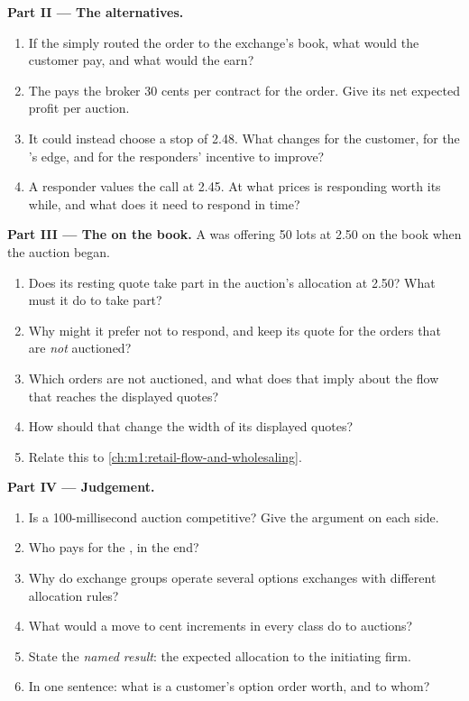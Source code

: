 \begin{problem}
\medskip\noindent\textbf{Part II --- The alternatives.}
\begin{enumerate}[resume]
\item If the  simply routed the order to the exchange's book, what
would the customer pay, and what would the  earn?
\item The  pays the broker 30 cents per contract for the order.
Give its net expected profit per auction.
\item It could instead choose a stop of 2.48. What changes for the customer,
for the 's edge, and for the responders' incentive to improve?
\item A responder values the call at 2.45. At what prices is responding
worth its while, and what does it need to respond in time?
\end{enumerate}

\medskip\noindent\textbf{Part III --- The  on the book.}
A  was offering 50 lots at 2.50 on the book when the auction
began.
\begin{enumerate}[resume]
\item Does its resting quote take part in the auction's allocation at 2.50?
What must it do to take part?
\item Why might it prefer not to respond, and keep its quote for the orders
that are \emph{not} auctioned?
\item Which orders are not auctioned, and what does that imply about the flow
that reaches the displayed quotes?
\item How should that change the width of its displayed quotes?
\item Relate this to \cref{ch:m1:retail-flow-and-wholesaling}.
\end{enumerate}

\medskip\noindent\textbf{Part IV --- Judgement.}
\begin{enumerate}[resume]
\item Is a 100-millisecond auction competitive? Give the argument on each
side.
\item Who pays for the , in the end?
\item Why do exchange groups operate several options exchanges with different
allocation rules?
\item What would a move to cent increments in every class do to auctions?
\item State the \emph{named result}: the expected allocation to the
initiating firm.
\item In one sentence: what is a customer's option order worth, and to whom?
\end{enumerate}
\end{problem}

